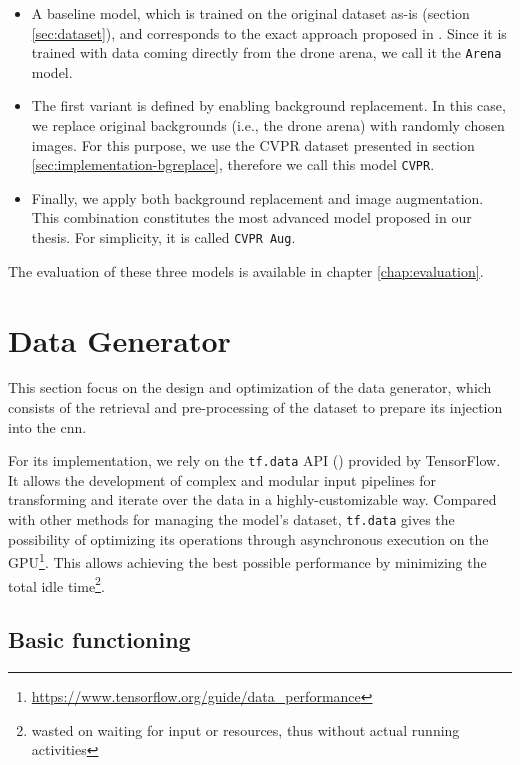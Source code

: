 \begin{itemize}
    \item A baseline model, which is trained on the original dataset as-is (section \ref{sec:dataset}), and corresponds to the exact approach proposed in \cite{mantegazza2019visionbased}. Since it is trained with data coming directly from the drone arena, we call it the \texttt{Arena} model.
    \item The first variant is defined by enabling background replacement. In this case, we replace original backgrounds (i.e., the drone arena) with randomly chosen images. For this purpose, we use the CVPR dataset presented in section \ref{sec:implementation-bgreplace}, therefore we call this model \texttt{CVPR}.
    \item Finally, we apply both background replacement and image augmentation. This combination constitutes the most advanced model proposed in our thesis. For simplicity, it is called \texttt{CVPR Aug}.
\end{itemize}

The evaluation of these three models is available in chapter \ref{chap:evaluation}.




\section{Data Generator}
\label{sec:data-generator}

This section focus on the design and optimization of the data generator, which consists of the retrieval and pre-processing of the dataset to prepare its injection into the \gls{cnn}.

For its implementation, we rely on the \texttt{tf.data} API (\cite{tfdata}) provided by TensorFlow. It allows the development of complex and modular input pipelines for transforming and iterate over the data in a highly-customizable way. Compared with other methods for managing the model's dataset, \texttt{tf.data} gives the possibility of optimizing its operations through asynchronous execution on the GPU\footnote{\url{https://www.tensorflow.org/guide/data_performance}}. This allows achieving the best possible performance by minimizing the total idle time\footnote{wasted on waiting for input or resources, thus without actual running activities}.



\subsection{Basic functioning}
\label{subsec:data-generator-basic}

